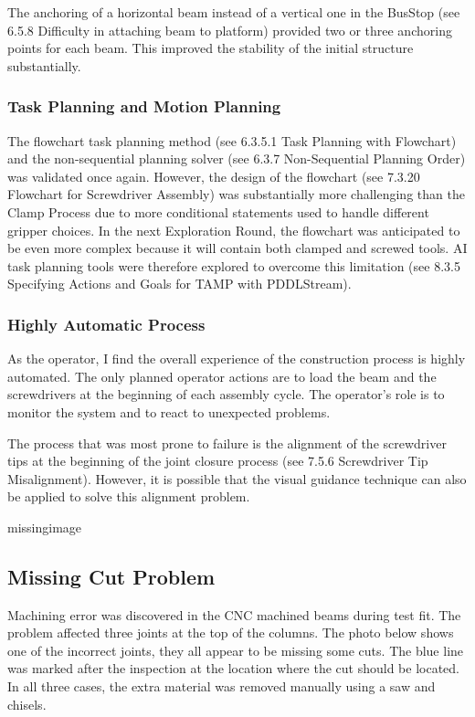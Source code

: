 The anchoring of a horizontal beam instead of a vertical one in the BusStop (see 6.5.8 Difficulty in attaching beam to platform) provided two or three anchoring points for each beam. This improved the stability of the initial structure substantially.

\subsubsection{Task Planning and Motion Planning}
The flowchart task planning method (see 6.3.5.1 Task Planning with Flowchart) and the non-sequential planning solver (see 6.3.7 Non-Sequential Planning Order) was validated once again. However, the design of the flowchart (see 7.3.20 Flowchart for Screwdriver Assembly) was substantially more challenging than the Clamp Process due to more conditional statements used to handle different gripper choices. 
In the next Exploration Round, the flowchart was anticipated to be even more complex because it will contain both clamped and screwed tools. AI task planning tools were therefore explored to overcome this limitation (see 8.3.5 Specifying Actions and Goals for TAMP with PDDLStream). 

\subsubsection{Highly Automatic Process}
As the operator, I find the overall experience of the construction process is highly automated. The only planned operator actions are to load the beam and the screwdrivers at the beginning of each assembly cycle. The operator’s role is to monitor the system and to react to unexpected problems.

The process that was most prone to failure is the alignment of the screwdriver tips at the beginning of the joint closure process (see 7.5.6 Screwdriver Tip Misalignment). However, it is possible that the visual guidance technique can also be applied to solve this alignment problem. 

missingimage

\subsection{Missing Cut Problem}
Machining error was discovered in the CNC machined beams during test fit. The problem affected three joints at the top of the columns. The photo below shows one of the incorrect joints, they all appear to be missing some cuts. The blue line was marked after the inspection at the location where the cut should be located. In all three cases, the extra material was removed manually using a saw and chisels. 

